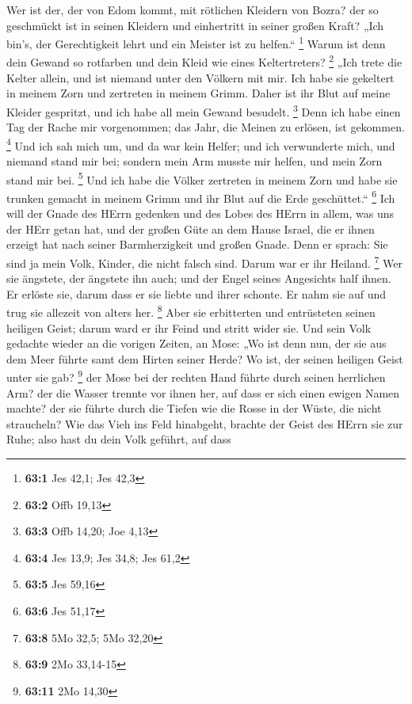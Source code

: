  Wer ist der, der von Edom kommt, mit rötlichen Kleidern von
Bozra? der so geschmückt ist in seinen Kleidern und einhertritt in
seiner großen Kraft? „Ich bin's, der Gerechtigkeit lehrt und ein Meister
ist zu helfen.`` \footnote{\textbf{63:1} Jes 42,1; Jes 42,3}
 Warum ist denn dein Gewand so rotfarben und dein Kleid wie
eines Keltertreters? \footnote{\textbf{63:2} Offb 19,13} 
„Ich trete die Kelter allein, und ist niemand unter den Völkern mit mir.
Ich habe sie gekeltert in meinem Zorn und zertreten in meinem Grimm.
Daher ist ihr Blut auf meine Kleider gespritzt, und ich habe all mein
Gewand besudelt. \footnote{\textbf{63:3} Offb 14,20; Joe 4,13}
 Denn ich habe einen Tag der Rache mir vorgenommen; das
Jahr, die Meinen zu erlösen, ist gekommen. \footnote{\textbf{63:4} Jes
  13,9; Jes 34,8; Jes 61,2}  Und ich sah mich um, und da war
kein Helfer; und ich verwunderte mich, und niemand stand mir bei;
sondern mein Arm musste mir helfen, und mein Zorn stand mir bei.
\footnote{\textbf{63:5} Jes 59,16}  Und ich habe die Völker
zertreten in meinem Zorn und habe sie trunken gemacht in meinem Grimm
und ihr Blut auf die Erde geschüttet.`` \footnote{\textbf{63:6} Jes
  51,17}  Ich will der Gnade des HErrn gedenken und des
Lobes des HErrn in allem, was uns der HErr getan hat, und der großen
Güte an dem Hause Israel, die er ihnen erzeigt hat nach seiner
Barmherzigkeit und großen Gnade.  Denn er sprach: Sie sind
ja mein Volk, Kinder, die nicht falsch sind. Darum war er ihr Heiland.
\footnote{\textbf{63:8} 5Mo 32,5; 5Mo 32,20}  Wer sie
ängstete, der ängstete ihn auch; und der Engel seines Angesichts half
ihnen. Er erlöste sie, darum dass er sie liebte und ihrer schonte. Er
nahm sie auf und trug sie allezeit von alters her. \footnote{\textbf{63:9}
  2Mo 33,14-15}  Aber sie erbitterten und entrüsteten
seinen heiligen Geist; darum ward er ihr Feind und stritt wider sie.
 Und sein Volk gedachte wieder an die vorigen Zeiten, an
Mose: „Wo ist denn nun, der sie aus dem Meer führte samt dem Hirten
seiner Herde? Wo ist, der seinen heiligen Geist unter sie gab?
\footnote{\textbf{63:11} 2Mo 14,30}  der Mose bei der
rechten Hand führte durch seinen herrlichen Arm? der die Wasser trennte
vor ihnen her, auf dass er sich einen ewigen Namen machte? 
der sie führte durch die Tiefen wie die Rosse in der Wüste, die nicht
straucheln?  Wie das Vieh ins Feld hinabgeht, brachte der
Geist des HErrn sie zur Ruhe; also hast du dein Volk geführt, auf dass
